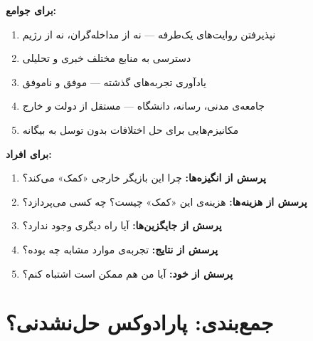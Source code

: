 \begin{tcolorbox}[wavebox, title={واکسیناسیون علیه هر دو نوع سوءاستفاده}]
\textbf{برای جوامع:}
\begin{enumerate}
\item {} نپذیرفتن روایت‌های یک‌طرفه — نه از
مداخله‌گران، نه از رژیم
\item {} دسترسی به منابع مختلف خبری و تحلیلی
\item {} یادآوری تجربه‌های گذشته — موفق و ناموفق
\item {} جامعه‌ی مدنی، رسانه، دانشگاه — مستقل از
دولت \textit{و} خارج
\item {} مکانیزم‌هایی برای حل اختلافات بدون توسل
به بیگانه
\end{enumerate}

\tcblower

\textbf{برای افراد:}
\begin{enumerate}
\item \textbf{پرسش از انگیزه‌ها:} چرا این بازیگر خارجی «کمک» می‌کند؟
\item \textbf{پرسش از هزینه‌ها:} هزینه‌ی این «کمک» چیست؟ چه کسی می‌پردازد؟
\item \textbf{پرسش از جایگزین‌ها:} آیا راه دیگری وجود ندارد؟
\item \textbf{پرسش از نتایج:} تجربه‌ی موارد مشابه چه بوده؟
\item \textbf{پرسش از خود:} آیا من هم ممکن است اشتباه کنم؟
\end{enumerate}
\end{tcolorbox}


\section{جمع‌بندی: پارادوکس حل‌نشدنی؟}
\label{sec:ch15-conclusion}

